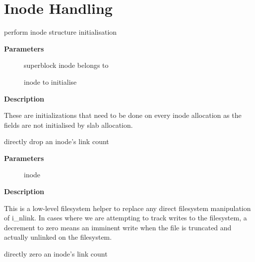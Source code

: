 \documentclass[a4paper,8pt,english]{sphinxmanual}
\begin{document}
\section{Inode Handling}
\label{filesystems/index:inode-handling}

\begin{fulllineitems}
\label{filesystems/index:c.inode_init_always}
perform inode structure initialisation

\end{fulllineitems}


\textbf{Parameters}
\begin{description}
\item[{}] \leavevmode
superblock inode belongs to

\item[{}] \leavevmode
inode to initialise

\end{description}

\textbf{Description}

These are initializations that need to be done on every inode
allocation as the fields are not initialised by slab allocation.

\begin{fulllineitems}
\label{filesystems/index:c.drop_nlink}
directly drop an inode's link count

\end{fulllineitems}


\textbf{Parameters}
\begin{description}
\item[{}] \leavevmode
inode

\end{description}

\textbf{Description}

This is a low-level filesystem helper to replace any
direct filesystem manipulation of i\_nlink.  In cases
where we are attempting to track writes to the
filesystem, a decrement to zero means an imminent
write when the file is truncated and actually unlinked
on the filesystem.

\begin{fulllineitems}
\label{filesystems/index:c.clear_nlink}
directly zero an inode's link count

\end{fulllineitems}
\end{document}
